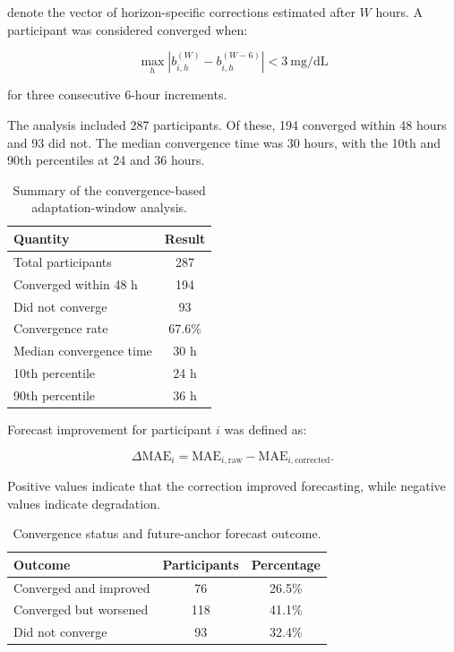 denote the vector of horizon-specific corrections estimated after $W$ hours.
A participant was considered converged when:

\begin{equation}
\max_h
\left|
b^{(W)}_{i,h}
-
b^{(W-6)}_{i,h}
\right|
<
3~\mathrm{mg/dL}
\end{equation}

for three consecutive 6-hour increments.

The analysis included 287 participants. Of these, 194 converged within 48
hours and 93 did not. The median convergence time was 30 hours, with the 10th
and 90th percentiles at 24 and 36 hours.

\begin{table}[H]
\centering
\caption{Summary of the convergence-based adaptation-window analysis.}
\label{tab:convergence_summary}
\begin{tabular}{lc}
\toprule
Quantity & Result \\
\midrule
Total participants & 287 \\
Converged within 48 h & 194 \\
Did not converge & 93 \\
Convergence rate & 67.6\% \\
Median convergence time & 30 h \\
10th percentile & 24 h \\
90th percentile & 36 h \\
\bottomrule
\end{tabular}
\end{table}

Forecast improvement for participant $i$ was defined as:

\begin{equation}
\Delta\mathrm{MAE}_i
=
\mathrm{MAE}_{i,\mathrm{raw}}
-
\mathrm{MAE}_{i,\mathrm{corrected}}.
\end{equation}

Positive values indicate that the correction improved forecasting, while
negative values indicate degradation.

\begin{table}[H]
\centering
\caption{Convergence status and future-anchor forecast outcome.}
\label{tab:convergence_outcome}
\begin{tabular}{lcc}
\toprule
Outcome & Participants & Percentage \\
\midrule
Converged and improved & 76 & 26.5\% \\
Converged but worsened & 118 & 41.1\% \\
Did not converge & 93 & 32.4\% \\
\bottomrule
\end{tabular}
\end{table}

